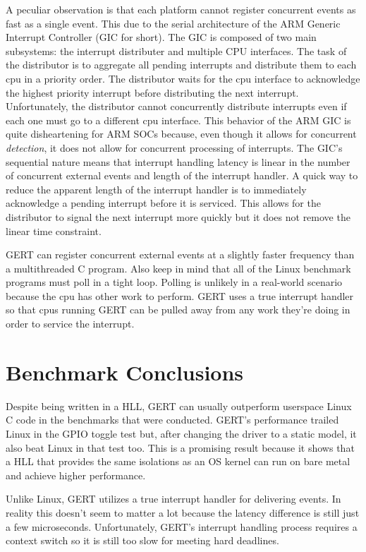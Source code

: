 A peculiar observation is that each platform cannot register concurrent events as fast as a single
event. This due to the serial architecture of the ARM Generic Interrupt Controller (GIC for short).
The GIC is composed of two main subsystems: the interrupt distributer and multiple CPU interfaces.
The task of the distributor is to aggregate all pending interrupts and distribute them to each cpu
in a priority order. The distributor waits for the cpu interface to acknowledge the highest priority
interrupt before distributing the next interrupt.
Unfortunately, the distributor cannot concurrently distribute interrupts even if
each one must go to a different cpu interface. This behavior of the ARM GIC is quite disheartening
for ARM SOCs because, even though it allows for concurrent \textit{detection}, it does not allow for
concurrent processing of interrupts. The GIC's sequential nature means that interrupt handling latency
is linear in the number of concurrent external events and length of the interrupt handler. A quick way
to reduce the apparent length of the interrupt handler is to immediately acknowledge a pending interrupt
before it is serviced. This allows for the distributor to signal the next interrupt more quickly but it does
not remove the linear time constraint.

GERT can register concurrent external events at a slightly faster frequency than a multithreaded C program.
Also keep in mind that all of the Linux benchmark programs must poll in a tight loop. Polling is unlikely in a
real-world scenario because the cpu has other work to perform. GERT uses a true interrupt handler so that cpus
running GERT can be pulled away from any work they're doing in order to service the interrupt.


\section{Benchmark Conclusions}

Despite being written in a HLL, GERT can usually outperform userspace
Linux C code in the benchmarks that were conducted. GERT's performance trailed
Linux in the GPIO toggle test but, after changing the driver to a static model,
it also beat Linux in that test too. This is a promising result because it shows
that a HLL that provides the same isolations as an OS kernel can run on bare metal
and achieve higher performance.

Unlike Linux, GERT utilizes a true interrupt handler for delivering events.
In reality this doesn't seem to matter a lot because the latency difference
is still just a few microseconds. Unfortunately, GERT's interrupt handling
process requires a context switch so it is still too slow for meeting hard
deadlines.

